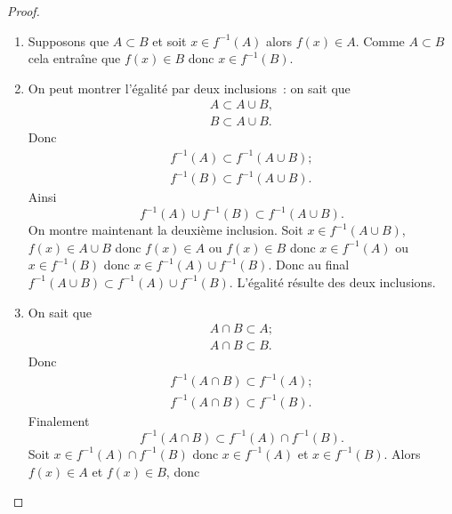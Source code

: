 \begin{proof}
    \begin{enumerate}
        \item Supposons que \(A \subset B\) et soit \(x \in f^{-1}(A)\) alors 
            \(f(x) \in A\). Comme \(A\subset B\) cela entraîne que \(f(x) \in 
            B\) donc \(x \in f^{-1}(B)\).
        \item On peut montrer l'égalité par deux inclusions~: on sait que
            \begin{gather}
                A \subset A \cup B, \\
                B \subset A \cup B.
            \end{gather}
            Donc
            \begin{gather} 
                f^{-1}(A) \subset f^{-1}(A \cup B); \\
                f^{-1}(B) \subset f^{-1}(A \cup B).
            \end{gather}
            Ainsi 
            \begin{equation}
                f^{-1}(A) \cup f^{-1}(B) \subset f^{-1}(A \cup B).
            \end{equation}
            On montre maintenant la deuxième inclusion. Soit \(x \in f^{-1}(A 
            \cup B)\), \(f(x) \in A \cup B\) donc \(f(x) \in A\) ou \(f(x) \in 
            B\) donc \(x \in f^{-1}(A)\) ou \(x \in f^{-1}(B)\) donc \(x \in 
            f^{-1}(A) \cup f^{-1}(B)\). Donc au final \(f^{-1}(A \cup B) \subset 
            f^{-1}(A) \cup f^{-1}(B)\). L'égalité résulte des deux inclusions.
        \item On sait que
            \begin{gather}
                A \cap B \subset A ; \\ A \cap B \subset B.
            \end{gather}
            Donc
            \begin{gather}
                f^{-1}(A \cap B) \subset f^{-1}(A); \\ f^{-1}(A \cap B) \subset 
                f^{-1}(B).
            \end{gather}
            Finalement
            \begin{equation}
                f^{-1}(A \cap B) \subset f^{-1}(A) \cap f^{-1}(B).
            \end{equation}
            Soit \(x \in f^{-1}(A) \cap f^{-1}(B)\) donc \(x \in f^{-1}(A)\) et 
            \(x \in f^{-1}(B)\). Alors \(f(x) \in A\) et \(f(x) \in B\), donc 

\end{enumerate}
\end{proof}
